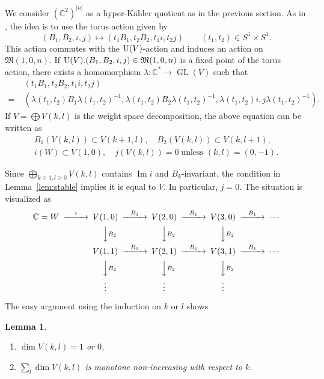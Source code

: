 \documentclass[12pt]{amsart}
\renewcommand{\frak}{\mathfrak}
\newtheorem{Lemma}[equation]{Lemma}
\theoremstyle{definition}
\theoremstyle{remark}
\numberwithin{equation}{section}
\newcommand{\lemref}[1]{Lemma~\ref{#1}}
\newcommand{\C}{{\mathbb C}}
\newcommand{\GL}{\operatorname{GL}}
\newcommand{\U}{\operatorname{\rm U}}
\newcommand{\Ima}{\operatorname{Im}}
\newcommand{\Hilb}[2]{{#1}^{\lbrack{#2}\rbrack}} %
\newcommand{\Hilbn}[1]{\Hilb{#1}{n}}
\newcommand{\M}{{\frak M}} %
\begin{document}
We consider $\Hilbn{(\C^2)}$ as a hyper-K\"ahler quotient as in the
previous section.
As in \cite{ES,Na-homology}, the idea is to use the torus action given
by
\begin{equation*}
  (B_1, B_2, i, j) \mapsto (t_1 B_1, t_2 B_2, t_1 i, t_2 j)
  \qquad (t_1, t_2)\in S^1\times S^1.
\end{equation*}
This action commutes with the $\U(V)$-action and induces an action on
$\M(1,0,n)$.
If $\U(V).(B_1, B_2, i, j)\in\M(1,0,n)$ is a fixed point of the torus
action, there exists a homomorphism $\lambda\colon\C^\ast\to\GL(V)$
such that
\begin{equation*}\begin{split}
  & (t_1 B_1, t_2 B_2, t_1 i, t_2 j) \\
  =\; &(\lambda(t_1,t_2) B_1 \lambda(t_1,t_2)^{-1},
     \lambda(t_1,t_2) B_2 \lambda(t_1,t_2)^{-1}, \lambda(t_1,t_2)i,
     j\lambda(t_1,t_2)^{-1}).
\end{split}\end{equation*}
If $V = \bigoplus V(k,l)$ is the weight space decomposition, the above
equation can be written as
\begin{gather*}
  B_1(V(k,l))\subset V(k+1,l), \quad B_2(V(k,l))\subset V(k,l+1), \\
  i(W)\subset V(1,0), \quad j(V(k,l)) = 0 \;\text{unless $(k,l) = (0,-1)$}.
\end{gather*}

Since $\bigoplus_{k \ge 1, l \ge 0} V(k,l)$ contains $\Ima i$ and
$B_k$-invariant, the condition in \lemref{lem:stable} implies
it is equal to $V$. In particular, $j = 0$.
The situation is visualized as
\begin{equation*}
\begin{CD}
  \C = W @>i>> V(1,0) @>B_1>> V(2,0) @>B_1>> V(3,0) @>B_1>> \cdots\\
         @.   @VVB_2V         @VVB_2V        @VVB_2V        \\
         @.    V(1,1) @>B_1>> V(2,1) @>B_1>> V(3,1) @>B_1>> \cdots\\
         @.   @VVB_2V         @VVB_2V        @VVB_2V        \\
         @.    \vdots @.      \vdots @.      \vdots
\end{CD}
\end{equation*}

The easy argument using the induction on $k$ or $l$ shows
\begin{Lemma}
  \begin{enumerate}
  \item   $\dim V(k,l) = 1$ or $0$,
  \item   $\sum_l \dim V(k,l)$ is monotone non-increasing with respect
    to $k$.
  \end{enumerate}
\end{Lemma}
\end{document}
